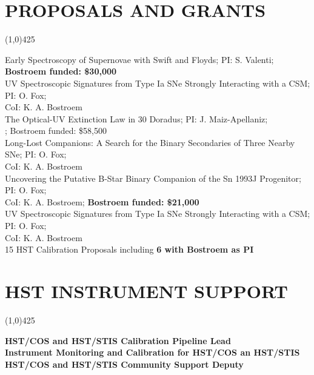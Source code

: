\documentclass{res}
\begin{document}
\begin{resume}
\section{PROPOSALS AND GRANTS}
\vspace{-.2in} 
\begin{center}
\line(1,0){425}
\end{center}
\vspace{-.25in} 
\vspace{0.1in}
Early Spectroscopy of Supernovae with Swift and Floyds; PI: S. Valenti; \\
\hspace*{24pt} {\bf Bostroem funded: \$30,000} \\
UV Spectroscopic Signatures from Type Ia SNe Strongly Interacting with a CSM; PI: O. Fox; \\
\hspace*{24pt}CoI: K. A. Bostroem \\
The Optical-UV Extinction Law in 30 Doradus; PI: J. Maiz-Apellaniz; \\
 \hspace*{24pt}{\bf Admin PI: K. A. Bostroem}; Bostroem funded: \$58,500 \\
Long-Lost Companions: A Search for the Binary Secondaries of Three Nearby SNe; PI: O. Fox; \\
\hspace*{24pt}CoI: K. A. Bostroem \\
Uncovering the Putative B-Star Binary Companion of the Sn 1993J Progenitor; PI: O. Fox; \\
\hspace*{24pt}CoI: K. A. Bostroem; {\bf Bostroem funded: \$21,000} \\
UV Spectroscopic Signatures from Type Ia SNe Strongly Interacting with a CSM; PI: O. Fox; \\
\hspace*{24pt}CoI: K. A. Bostroem  \\
15 HST Calibration Proposals including {\bf 6 with Bostroem as PI}
%
\section{HST INSTRUMENT SUPPORT} 
\vspace{-.2in}
\begin{center}
\line(1,0){425}
\end{center}
\vspace{-.3in}
\vspace{0.1in}
{\bf HST/COS and HST/STIS Calibration Pipeline Lead} \\
{\bf Instrument Monitoring and Calibration for HST/COS an HST/STIS} \\
{\bf HST/COS and HST/STIS Community Support Deputy} 
%

\end{resume}
\end{document}
